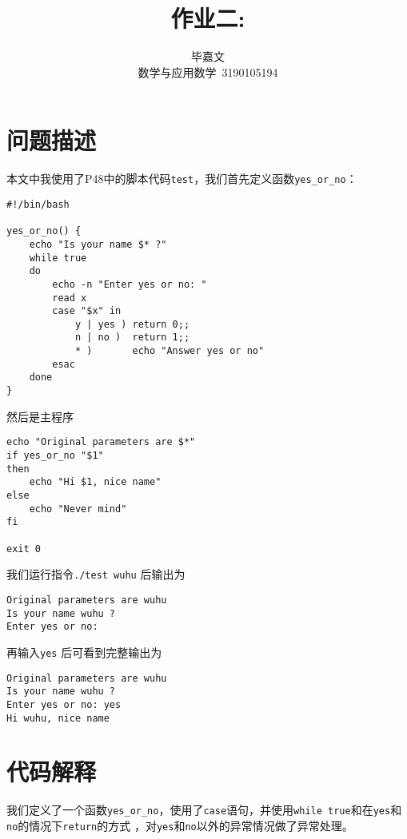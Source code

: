 \documentclass[UTF8]{ctexart}
\title{作业二: }
\author{毕嘉文 \\ 数学与应用数学\ 3190105194}
\begin{document}
\maketitle


\section{问题描述}
本文中我使用了P48中的脚本代码\verb|test|，我们首先定义函数\verb|yes_or_no|：
\begin{verbatim}#!/bin/bash 

yes_or_no() { 
	echo "Is your name $* ?"
	while true 
	do 
		echo -n "Enter yes or no: "
		read x 
		case "$x" in 
			y | yes ) return 0;; 
			n | no )  return 1;; 
			* )       echo "Answer yes or no"
		esac 
	done 
}\end{verbatim}
然后是主程序
\begin{verbatim}echo "Original parameters are $*"
if yes_or_no "$1"
then 
	echo "Hi $1, nice name"
else 
	echo "Never mind"
fi 

exit 0\end{verbatim}
我们运行指令\verb|./test wuhu| 后输出为\begin{verbatim}
Original parameters are wuhu
Is your name wuhu ?
Enter yes or no:\end{verbatim} 再输入\verb|yes| 后可看到完整输出为\begin{verbatim}Original parameters are wuhu
Is your name wuhu ?
Enter yes or no: yes
Hi wuhu, nice name
\end{verbatim}
\section{代码解释}
我们定义了一个函数\verb|yes_or_no|，使用了\verb|case|语句，并使用\verb|while true|和在\verb|yes|和\verb|no|的情况下\verb|return|的方式
，对\verb|yes|和\verb|no|以外的异常情况做了异常处理。

\begin{verbatim}\end{verbatim}
\end{document}
